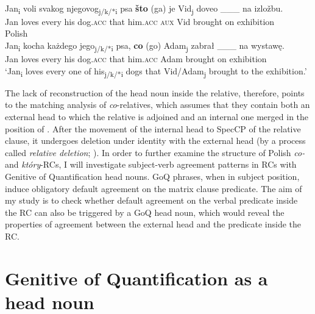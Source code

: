 \documentclass[output=paper]{langsci/langscibook}
\begin{document}
\ea%
    \label{ex:leska:16}
    \ea  {}\\
    \gll Jan\textsubscript{i}  voli   svakog   njegovog\textsubscript{j/k/*i} psa   \textbf{što} (ga)   je   Vid\textsubscript{j}  doveo \_\_\_   na izložbu.   \\
         Jan   loves every   his   dog.\textsc{acc}  that him.\textsc{acc} \textsc{aux}  Vid                               brought {}  on exhibition \\
    \ex  Polish\\
    \gll Jan\textsubscript{i} kocha   każdego   jego\textsubscript{j/k/*i} psa,   \textbf{co}  (go)     Adam\textsubscript{j}   zabrał \_\_\_     na wystawę.\\
         Jan  loves   every   his   dog.\textsc{acc}  that  him.\textsc{acc}  Adam     brought {}  on exhibition    \\
    \glt ‘Jan\textsubscript{i} loves every one of his\textsubscript{j/k/*i} dogs that Vid\slash Adam\textsubscript{j} brought to the exhibition.’
    \z
\z

The lack of reconstruction of the head noun inside the relative, therefore, points to the matching analysis of \textit{co}{}-relatives, which assumes that they contain both an external head to which the relative is adjoined and an internal one merged in the position of  \citep{Bhatt2002,Sauerland2002,Hulsey2006}. After the movement of the internal head to SpecCP of the relative clause, it undergoes deletion under identity with the external head (by a process called \textit{relative deletion}; \citealt{Sauerland2002}). In order to further examine the structure of Polish \textit{co{}-} and \textit{który}{}-RCs, I will investigate subject-verb agreement patterns in RCs with Genitive of Quantification head nouns. GoQ phrases, when in subject position, induce obligatory default agreement on the matrix clause predicate. The aim of my study is to check whether default agreement on the verbal predicate inside the RC can also be triggered by a GoQ head noun, which would reveal the properties of agreement between the external head and the predicate inside the RC.

\section{Genitive of Quantification as a head noun} %
\end{document}
